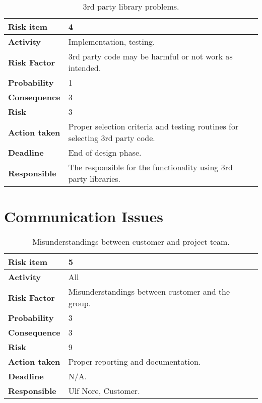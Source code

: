\begin{table}[h!]
\begin{center}
\begin{tabularx}{\textwidth}{| X | X |}
\hline
\textbf{Risk item} & 4 \\
\hline
\textbf{Activity} & Implementation, testing.  \\
\hline
\textbf{Risk Factor} & 3rd party code may be harmful or not work as intended. \\
\hline
\textbf{Probability} & 1 \\
\hline
\textbf{Consequence} & 3 \\
\hline
\textbf{Risk} & 3 \\
\hline
\textbf{Action taken} & Proper selection criteria and testing routines for selecting 3rd party code. \\
\hline
\textbf{Deadline} & End of design phase. \\
\hline
\textbf{Responsible} & The responsible for the functionality using 3rd party libraries. \\
\hline
\end{tabularx}
\caption{3rd party library problems.}
\end{center}
\label{risk_7}
\end{table}





\section{Communication Issues}


\begin{table}[h!]

\begin{center}
\begin{tabularx}{\textwidth}{| X | X |}
\hline
\textbf{Risk item} & 5 \\
\hline
\textbf{Activity} & All  \\
\hline
\textbf{Risk Factor} & Misunderstandings between customer and the group. \\
\hline
\textbf{Probability} & 3 \\
\hline
\textbf{Consequence} & 3 \\
\hline
\textbf{Risk} & 9 \\
\hline
\textbf{Action taken} & Proper reporting and documentation. \\
\hline
\textbf{Deadline} & N/A. \\
\hline
\textbf{Responsible} & Ulf Nore, Customer. \\
\hline
\end{tabularx}
\caption{Misunderstandings between customer and project team.}
\end{center}
\label{risk_8}
\end{table}



